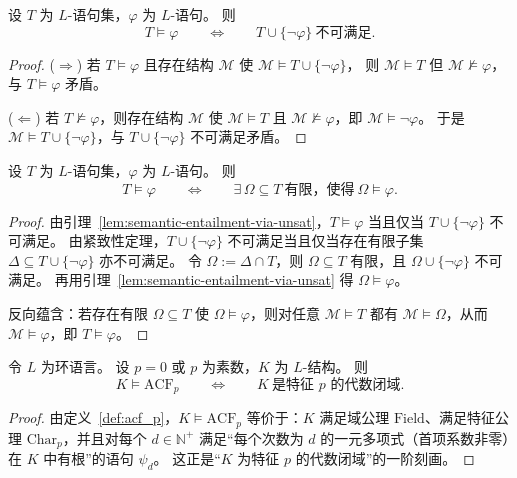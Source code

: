 \documentclass[lang=cn,a4paper,newtx,section]{elegantbook}
\begin{document}
\begin{lemma}
\label{semantic-entailment-via-unsat}
设 $T$ 为 $L$-语句集，$\varphi$ 为 $L$-语句。
则
\[
  T\models\varphi\qquad\Longleftrightarrow\qquad T\cup\{\neg\varphi\}\ \text{不可满足}.
\]
\end{lemma}

\begin{proof}
($\Rightarrow$)
若 $T\models\varphi$ 且存在结构 $\mathcal M$ 使 $\mathcal M\models T\cup\{\neg\varphi\}$，
则 $\mathcal M\models T$ 但 $\mathcal M\not\models\varphi$，与 $T\models\varphi$ 矛盾。

($\Leftarrow$)
若 $T\not\models\varphi$，则存在结构 $\mathcal M$ 使 $\mathcal M\models T$ 且 $\mathcal M\not\models\varphi$，即 $\mathcal M\models\neg\varphi$。
于是 $\mathcal M\models T\cup\{\neg\varphi\}$，与 $T\cup\{\neg\varphi\}$ 不可满足矛盾。
\end{proof}

\begin{lemma}
\label{finite-subset-entailment}
设 $T$ 为 $L$-语句集，$\varphi$ 为 $L$-语句。
则
\[
  T\models\varphi\qquad\Longleftrightarrow\qquad \exists\,\Omega\subseteq T\ \text{有限，使得}\ \Omega\models\varphi.
\]
\end{lemma}

\begin{proof}
由引理~\ref{lem:semantic-entailment-via-unsat}，$T\models\varphi$ 当且仅当 $T\cup\{\neg\varphi\}$ 不可满足。
由紧致性定理，$T\cup\{\neg\varphi\}$ 不可满足当且仅当存在有限子集 $\Delta\subseteq T\cup\{\neg\varphi\}$ 亦不可满足。
令 $\Omega:=\Delta\cap T$，则 $\Omega\subseteq T$ 有限，且 $\Omega\cup\{\neg\varphi\}$ 不可满足。
再用引理~\ref{lem:semantic-entailment-via-unsat} 得 $\Omega\models\varphi$。

 反向蕴含：若存在有限 $\Omega\subseteq T$ 使 $\Omega\models\varphi$，则对任意 $\mathcal M\models T$ 都有 $\mathcal M\models\Omega$，从而 $\mathcal M\models\varphi$，即 $T\models\varphi$。
 \end{proof}

 \begin{proposition}
 \label{models-of-acf_p}
 令 $L$ 为环语言。
 设 $p=0$ 或 $p$ 为素数，$K$ 为 $L$-结构。
 则
 \[
   K\models\mathrm{ACF}_p\qquad\Longleftrightarrow\qquad K\ \text{是特征 $p$ 的代数闭域}.
 \]
 \end{proposition}
 
 \begin{proof}
 由定义~\ref{def:acf_p}，$K\models\mathrm{ACF}_p$ 等价于：$K$ 满足域公理 $\mathrm{Field}$、满足特征公理 $\mathrm{Char}_p$，并且对每个 $d\in\mathbb N^{+}$ 满足“每个次数为 $d$ 的一元多项式（首项系数非零）在 $K$ 中有根”的语句 $\psi_d$。
 这正是“$K$ 为特征 $p$ 的代数闭域”的一阶刻画。
 \end{proof}
 
\end{document}
